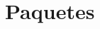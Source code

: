 \documentclass[bibtex, anon]{TEMat-article}
\begin{document}
%
%
%
%

\section{Paquetes}
\end{document}
